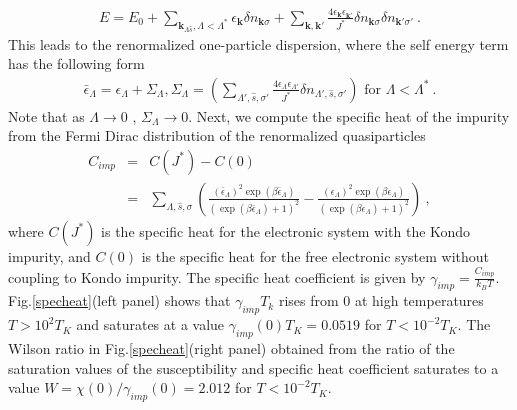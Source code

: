 \documentclass[aps,prb,preprint,groupedaddress]{revtex4-2}
\begin{document}
\begin{eqnarray}
E=E_{0}+\sum_{\mathbf{k}_{\Lambda\hat{s}},\Lambda<\Lambda^{*}}\epsilon_{\mathbf{k}}\delta n_{\mathbf{k}\sigma}+\sum_{\mathbf{k},\mathbf{k}'}\frac{4\epsilon_{\mathbf{k}}\epsilon_{\mathbf{k}'}}{J^{*}}\delta n_{\mathbf{k}\sigma}\delta n_{\mathbf{k}'\sigma'}~.
\label{localfermiliq}
\end{eqnarray}
This leads to the renormalized one-particle dispersion, where the  self energy term has the following form
\begin{eqnarray}
\bar{\epsilon}_{\Lambda}=\epsilon_{\Lambda}+\Sigma_{\Lambda} ,\Sigma_{\Lambda}=(\sum_{\Lambda',\hat{s},\sigma'}\frac{4\epsilon_{\Lambda}\epsilon_{\Lambda'}}{J^{*}}\delta n_{\Lambda',\hat{s},\sigma'}) \text{ for }\Lambda<\Lambda^{*}~. 
\end{eqnarray}
Note that as $\Lambda\to 0$ , $\Sigma_{\Lambda}\to 0$. Next, we compute the specific heat of the impurity from the Fermi Dirac distribution of the renormalized quasiparticles
\begin{eqnarray}
C_{imp}&=&C(J^{*})-C(0)\nonumber\\
&=&\sum_{\Lambda,\hat{s},\sigma}\left(\frac{(\bar{\epsilon}_{\Lambda})^{2}\exp(\beta\bar{\epsilon}_{\Lambda})}{(\exp(\beta\bar{\epsilon}_{\Lambda})+1)^{2}}-\frac{(\epsilon_{\Lambda})^{2}\exp(\beta\epsilon_{\Lambda})}{(\exp(\beta\epsilon_{\Lambda})+1)^{2}}\right)~,
\end{eqnarray}
where $C(J^{*})$ is the specific heat for the electronic system with the Kondo impurity, and $C(0)$ is the specific heat for the free electronic system without coupling to Kondo impurity. The specific heat coefficient is given by $\gamma_{imp}=\frac{C_{imp}}{k_{B}T}$. Fig.\ref{specheat}(left panel) shows that $\gamma_{imp}T_{k}$ rises from 0 at high temperatures $T>10^{2}T_{K}$ and saturates at a value $\gamma_{imp}(0)T_{K}=0.0519$ for $T<10^{-2}T_{K}$. The Wilson ratio in Fig.\ref{specheat}(right panel) obtained from the ratio of the saturation values of the susceptibility and specific heat coefficient saturates to a value $W=\chi(0)/\gamma_{imp}(0)=2.012$ for $T<10^{-2}T_{K}$.
\end{document}
